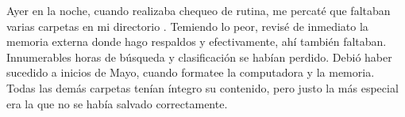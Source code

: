 \markdownRendererInterblockSeparator
{}\markdownRendererInterblockSeparator
{}Ayer en la noche, cuando realizaba chequeo de rutina, me percaté que faltaban varias carpetas en mi directorio . Temiendo lo peor, revisé de inmediato la memoria externa donde hago respaldos y efectivamente, ahí también faltaban. Innumerables horas de búsqueda y clasificación se habían perdido. Debió haber sucedido a inicios de Mayo, cuando formatee la computadora y la memoria. Todas las demás carpetas tenían íntegro su contenido, pero justo la más especial era la que no se había salvado correctamente.\relax